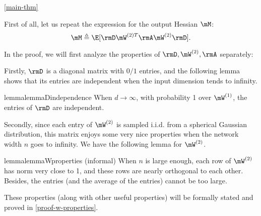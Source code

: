 \begin{proofof}{\cref{main-thm}}

First of all, let us repeat the expression for the output Hessian $\mM$:
\begin{equation}
\mM\triangleq\E[\rmD\mW^{(2)T}\rmA\mW^{(2)}\rmD].
\end{equation}




In the proof, we will first analyze the properties of $\rmD, \mW^{(2)}, \rmA$ separately:

Firstly, $\rmD$ is a diagonal matrix with $0/1$ entries, and the following lemma shows that its entries are independent when the input dimension tends to infinity.
\begin{restatable}{lemma}{lemmaDindependence}
\label{d-independence}
When $d\to \infty$, with probability 1 over $\mW^{(1)}$, the entries of $\rmD$ are independent.
\end{restatable}
Secondly, since each entry of $\mW^{(2)}$ is sampled i.i.d. from a spherical Gaussian distribution, this matrix enjoys some very nice properties when the network width $n$ goes to infinity. We have the following lemma for $\mW^{(2)}$.
\begin{restatable}{lemma}{lemmaWproperties}
\label{lemma:W-properties}
(informal) When $n$ is large enough, each row of $\mW^{(2)}$ has norm very close to 1, and these rows are nearly orthogonal to each other. Besides, the entries (and the average of the entries) cannot be too large.
\end{restatable}
These properties (along with other useful properties) will be formally stated and proved in \cref{proof-w-properties}.


\end{proofof}
